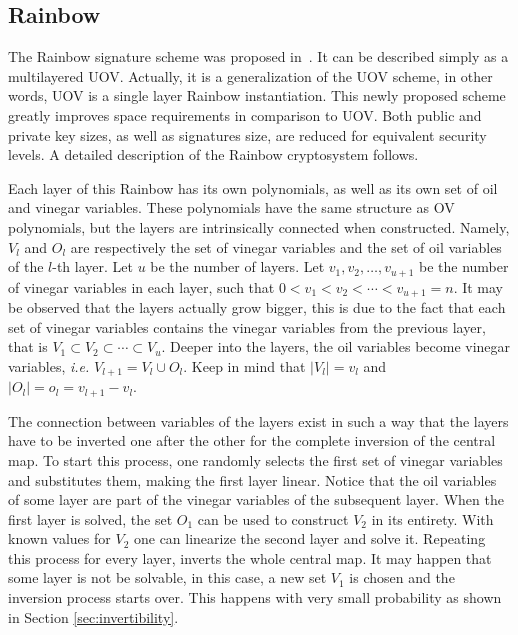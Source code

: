 \documentclass{ufsctex/ufsctex}
\begin{document}
\subsection{Rainbow}\label{sec:rainbow}

The Rainbow signature scheme was proposed in~\cite{ding2005rainbow}. It can be
described simply as a multilayered UOV. Actually, it is a generalization of the
UOV scheme, in other words, UOV is a single layer Rainbow instantiation. This
newly proposed scheme greatly improves space requirements in comparison to UOV.
Both public and private key sizes, as well as signatures size, are reduced for
equivalent security levels. A detailed description of the Rainbow cryptosystem
follows.

Each layer of this Rainbow has its own polynomials, as well as its own set of
oil and vinegar variables. These polynomials have the same structure as OV
polynomials, but the layers are intrinsically connected when constructed.
Namely, $V_l$ and $O_l$ are respectively the set of vinegar variables and the
set of oil variables of the $l$-th layer. Let $u$ be the number of layers. Let
$v_1, v_2, \dots, v_{u+1}$ be the number of vinegar variables in each layer,
such that $0 < v_1 < v_2 < \cdots < v_{u+1} = n$. It may be observed that the
layers actually grow bigger, this is due to the fact that each set of vinegar
variables contains the vinegar variables from the previous layer, that is $V_1
\subset V_2 \subset \cdots \subset V_{u}$. Deeper into the layers, the oil
variables become vinegar variables, \textit{i.e.} $V_{l+1} = V_l \cup O_l$.
Keep in mind that $|V_l| = v_l$ and $|O_l| = o_l = v_{l+1} - v_{l}$.

The connection between variables of the layers exist in such a way that the
layers have to be inverted one after the other for the complete inversion of
the central map. To start this process, one randomly selects the first set of
vinegar variables and substitutes them, making the first layer linear. Notice
that the oil variables of some layer are part of the vinegar variables of the
subsequent layer. When the first layer is solved, the set $O_1$ can be used to
construct $V_2$ in its entirety. With known values for $V_2$ one can linearize
the second layer and solve it. Repeating this process for every layer, inverts
the whole central map. It may happen that some layer is not be solvable, in
this case, a new set $V_1$ is chosen and the inversion process starts over.
This happens with very small probability as shown in Section
\ref{sec:invertibility}.
\end{document}
